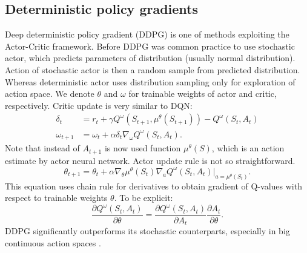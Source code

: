 \subsection{Deterministic policy gradients}
Deep deterministic policy gradient (DDPG) is one of methods exploiting the Actor-Critic framework. Before DDPG was common practice to use stochastic actor, which predicts parameters of distribution (usually normal distribution). Action of stochastic actor is then a random sample from predicted distribution. Whereas deterministic actor uses distribution sampling only for exploration of action space. We denote $\theta$ and $\omega$ for trainable weights of actor and critic, respectively. Critic update is very similar to DQN:
\begin{align}
\delta_t &= r_t + \gamma Q^\omega(S_{t+1}, \mu ^\theta (S_{t+1})) - Q^\omega(S_t, A_t)\\
\omega_{t+1} &= \omega_t + \alpha \delta_t \nabla_\omega Q^\omega(S_t, A_t).
\end{align}
Note that instead of $A_{t+1}$ is now used function $\mu^\theta(S)$, which is an action estimate by actor neural network. Actor update rule is not so straightforward. 
\begin{equation}
\theta_{t+1} = \theta_t + \alpha\nabla_\theta \mu^\theta(S_t)\nabla_a Q^\omega (S_t, A_t)|_{a = \mu^\theta(S_t)}.
\end{equation}
This equation uses chain rule for derivatives to obtain gradient of Q-values with respect to trainable weights $\theta$. To be explicit:
\begin{equation}
\frac{\partial Q^\omega(S_t, A_t)}{\partial \theta} = \frac{\partial Q^\omega(S_t, A_t)}{\partial A_t} \frac{\partial A_t}{\partial \theta}.
\end{equation}
DDPG significantly outperforms its stochastic counterparts, especially in big continuous action spaces \cite{silver2014}.


